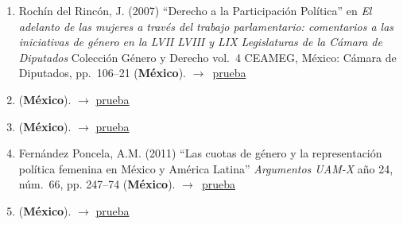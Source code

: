 \documentclass[12 pt, letter]{article}
\newenvironment{CitasMiTrabajo}{
    \begin{footnotesize}
    \begin{enumerate}[label={\footnotesize\emph{cita~\arabic*}},ref=\arabic*] %
        \setlength{\itemsep}{.1\itemsep}
        \setlength{\parskip}{.1\parskip}
    }{\end{enumerate}\end{footnotesize}}
\begin{document}
        \begin{CitasMiTrabajo}

        \item Roch\'in del Rinc\'on, J. (2007)
        ``Derecho a la Participaci\'on Pol\'itica''
        en \emph{El adelanto de las mujeres a trav\'es del trabajo parlamentario:
        comentarios a las iniciativas de g\'enero en la LVII LVIII y LIX
        Legislaturas de la C\'amara de Diputados}
        Colecci\'on G\'enero y Derecho vol.\ 4 CEAMEG,
        M\'exico: C\'amara de Diputados, pp.\ 106--21 (\textbf{M\'exico}). $\rightarrow$~\href{http://ericmagar.com/cv/cites/huertaMagar/cdip.pdf}{prueba}

        \item {} (\textbf{M\'exico}). $\rightarrow$ \href{http://ericmagar.com/cv/cites/huertaMagar/gonzalezMarin2008.pdf}{prueba}

        \item {} (\textbf{M\'exico}). $\rightarrow$ \href{http://ericmagar.com/cv/cites/huertaMagar/arroyo.etal2008.pdf}{prueba}

        \item Fern\'andez Poncela, A.M. (2011) ``Las cuotas de g\'enero y la representaci\'on pol\'itica femenina en M\'exico y Am\'erica Latina''
            \emph{Argumentos UAM-X} a\~no 24, n\'um.\ 66, pp. 247--74 (\textbf{M\'exico}). $\rightarrow$~\href{http://ericmagar.com/cv/cites/huertaMagar/fdzPoncela2011.pdf}{prueba}

        \item {} (\textbf{M\'exico}). $\rightarrow$ \href{http://ericmagar.com/cv/cites/huertaMagar/martinez.garridoRepresentacionDescSustMx2013rms.pdf}{prueba}

        \label{ncites:magar.huerta.2006} %

        \end{CitasMiTrabajo}





\end{document}
